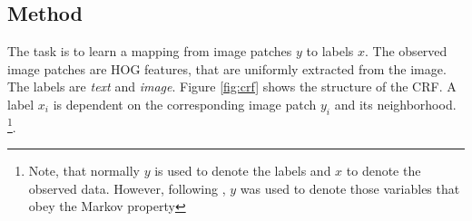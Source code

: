\subsection{Method}
\label{subsec:imagelocmethod}


The task is to learn a mapping from image patches $y$ to labels $x$. The
observed image patches are HOG features, that are uniformly extracted from the
image. The labels are \emph{text} and \emph{image}. Figure \ref{fig:crf} shows
the structure of the CRF. A label $x_i$ is dependent on the corresponding image
patch $y_i$ and its neighborhood. \footnote{Note, that normally $y$ is used
to denote the labels and $x$ to denote the observed data.  However, following
\cite{lafferty2001conditional, bishop2006pattern}, $y$ was used to denote those
variables that obey the Markov property}.

